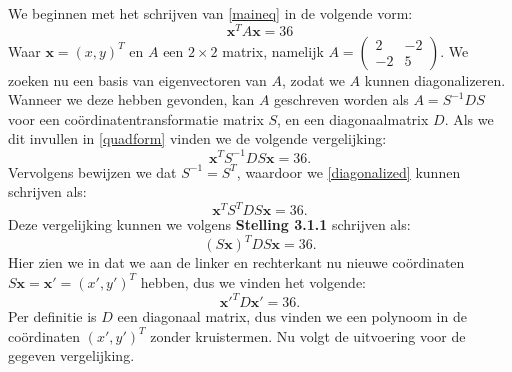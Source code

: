 \documentclass[12pt, dutch, a4paper]{article}
\theoremstyle{definition}
\begin{document}
\begin{enumerate}
    We beginnen met het schrijven van \cref{maineq} in de volgende vorm:
    \begin{equation}\label{quadform}
        \mathbf{x}^T A \mathbf{x} = 36
    \end{equation}
    Waar $\mathbf{x} = (x, y)^T$ en $A$ een $2\times 2$ matrix, namelijk 
    $A = \begin{pmatrix}
        2 & -2 \\
        -2 & 5
    \end{pmatrix}$. We zoeken nu een basis van eigenvectoren van $A$, zodat we $A$ kunnen diagonalizeren. Wanneer we deze hebben gevonden, kan $A$ geschreven worden als $A = S^{-1} D S$ voor een coördinatentransformatie matrix $S$, en een diagonaalmatrix $D$. Als we dit invullen in \cref{quadform} vinden we de volgende vergelijking: 
    \begin{equation}\label{diagonalized}
        \mathbf{x}^T S^{-1} D S \mathbf{x} = 36.
    \end{equation} 
    Vervolgens bewijzen we dat $S^{-1} = S^T$, waardoor we \cref{diagonalized} kunnen schrijven als:
    \begin{equation}
        \mathbf{x}^T S^T D S \mathbf{x} = 36.
    \end{equation} 
    Deze vergelijking kunnen we volgens \textbf{Stelling 3.1.1} schrijven als:
    \begin{equation}
        (S \mathbf{x})^T D S \mathbf{x} = 36.
    \end{equation}
    Hier zien we in dat we aan de linker en rechterkant nu nieuwe coördinaten $S\mathbf{x} = \mathbf{x'} = (x', y')^T$ hebben, dus we vinden het volgende:
    \begin{equation} \label{transed_eq}
        \mathbf{x'}^T D \mathbf{x'} = 36.
    \end{equation}
    Per definitie is $D$ een diagonaal matrix, dus vinden we een polynoom in de coördinaten $(x', y')^T$ zonder kruistermen. Nu volgt de uitvoering voor de gegeven vergelijking.


\end{enumerate}
\end{document}
